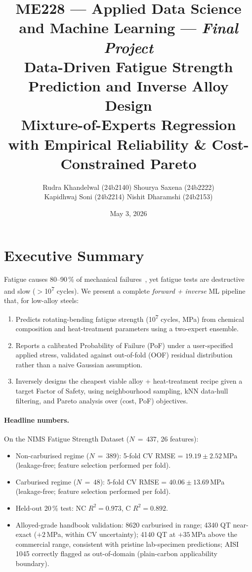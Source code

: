 \documentclass[12pt,a4paper]{article} %
\title{\vspace{-1em}
  \large\textbf{ME228 --- Applied Data Science and Machine Learning} --- \textit{Final Project}\\[3pt]
  \Large\textbf{Data-Driven Fatigue Strength Prediction and Inverse Alloy Design}\\[-2pt]
  \vspace{0.5cm}
  \normalsize Mixture-of-Experts Regression with Empirical Reliability \& Cost-Constrained Pareto
  \vspace{-0.5em}
}
\author{
  Rudra Khandelwal (24b2140) \quad Shourya Saxena (24b2222) \\[2pt]
  Kapidhwaj Soni (24b2214) \quad Nishit Dharamshi (24b2153)
  \vspace{-0.5em}
}
\date{May 3, 2026}
\begin{document}
\maketitle
\tableofcontents
\clearpage

\section{Executive Summary}

Fatigue causes 80--90\,\% of mechanical failures~\cite{agrawal2014}, yet fatigue tests are destructive and slow ($>$10\textsuperscript{7} cycles). We present a complete \emph{forward + inverse} ML pipeline that, for low-alloy steels:

\begin{enumerate}[nosep]
  \item Predicts rotating-bending fatigue strength (10\textsuperscript{7} cycles, MPa) from
        chemical composition and heat-treatment parameters using a two-expert ensemble.
  \item Reports a calibrated Probability of Failure (PoF) under a user-specified applied
        stress, validated against out-of-fold (OOF) residual distribution rather than a naive
        Gaussian assumption.
  \item Inversely designs the cheapest viable alloy + heat-treatment recipe given a target
        Factor of Safety, using neighbourhood sampling, kNN data-hull filtering, and Pareto
        analysis over (cost, PoF) objectives.
\end{enumerate}

\paragraph{Headline numbers.}
On the NIMS Fatigue Strength Dataset ($N\,{=}\,437$, 26 features):
\begin{itemize}[nosep]
  \item Non-carburised regime ($N\,{=}\,389$): 5-fold CV RMSE = $19.19 \pm 2.52$\,MPa
        (leakage-free; feature selection performed per fold).
  \item Carburised regime ($N\,{=}\,48$): 5-fold CV RMSE = $40.06 \pm 13.69$\,MPa
        (leakage-free; feature selection performed per fold).
  \item Held-out 20\,\% test: NC $R^2 = 0.973$, C $R^2 = 0.892$.
  \item Alloyed-grade handbook validation: 8620 carburised in range; 4340 QT
        near-exact ($+2$\,MPa, within CV uncertainty); 4140 QT at $+35$\,MPa above
        the commercial range, consistent with pristine lab-specimen predictions;
        AISI 1045 correctly flagged as out-of-domain (plain-carbon applicability boundary).
\end{itemize}
\end{document}
